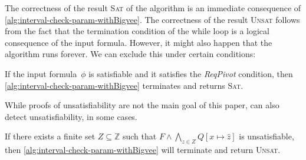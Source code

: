 \documentclass[runningheads]{llncs}
\newcommand{\qedhere}{$\blacksquare$}
\newcommand{\req}{\emph{ReqPivot}\xspace}
\newcommand{\repr}[1]{\hat{#1}}
\begin{document}




The correctness of the result \textsc{Sat} of the algorithm is an immediate consequence of \cref{alg:interval-check-param-withBigvee}. The correctness of the result \textsc{Unsat} follows from the fact that the termination condition of the while loop is a logical consequence of the input formula. However, it might also happen that the algorithm runs forever. We can exclude this under certain conditions:

\begin{theorem}
\label{thm:completeness-bigvee}
If the input formula~$\phi$ is satisfiable and it satisfies the \req condition, then \cref{alg:interval-check-param-withBigvee} terminates and returns \textsc{Sat}.
\end{theorem}

While proofs of unsatisfiability are not the main goal of this paper,  can also detect unsatisfiability, in some cases.

\begin{theorem}
\label{thm:finiteunsatThenUNSAT}
If there exists a finite set $Z\subseteq\mathbb{Z}$ such that $F \land \bigwedge_{z\in Z} Q[x \mapsto \repr{z}]$ is unsatisfiable, then \cref{alg:interval-check-param-withBigvee} will terminate and return \textsc{Unsat}.
\end{theorem}
\end{document}
